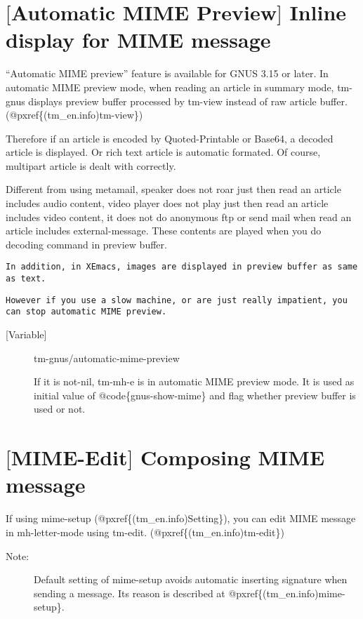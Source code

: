 \section{$[$Automatic MIME Preview$]$ Inline display for MIME message}
\medskip
\par
``Automatic MIME preview'' feature is available for GNUS 3.15 or
later. In automatic MIME preview mode, when reading an article in
summary mode, tm-gnus displays preview buffer processed by tm-view
instead of raw article buffer. (@pxref\{(tm\_en.info)tm-view\})
\medskip
\par
Therefore if an article is encoded by Quoted-Printable or Base64, a
decoded article is displayed. Or rich text article is automatic
formated. Of course, multipart article is dealt with correctly.
\medskip
\par
Different from using metamail, speaker does not roar just then read an
article includes audio content, video player does not play just then
read an article includes video content, it does not do anonymous ftp
or send mail when read an article includes external-message. These
contents are played when you do decoding command in preview buffer.
\medskip
{\baselineskip=10pt
\begin{verbatim}
In addition, in XEmacs, images are displayed in preview buffer as same
as text.
\end{verbatim}}
\medskip
{\baselineskip=10pt
\begin{verbatim}
However if you use a slow machine, or are just really impatient, you
can stop automatic MIME preview.
\end{verbatim}}
\medskip
\begin{description}
\item[{[}Variable{]}]tm-gnus/automatic-mime-preview
\medskip
\par
If it is not-nil, tm-mh-e is in automatic MIME preview mode.
It is used as initial value of @code\{gnus-show-mime\} and flag
whether preview buffer is used or not.
\medskip
\medskip
\end{description}

\section{$[$MIME-Edit$]$ Composing MIME message}
\medskip
\par
If using mime-setup (@pxref\{(tm\_en.info)Setting\}), you can edit MIME
message in mh-letter-mode using tm-edit. (@pxref\{(tm\_en.info)tm-edit\})
\medskip
\begin{description}
\item[Note:]Default setting of mime-setup avoids automatic inserting
signature when sending a message. Its reason is described at
@pxref\{(tm\_en.info)mime-setup\}.
\end{description}

